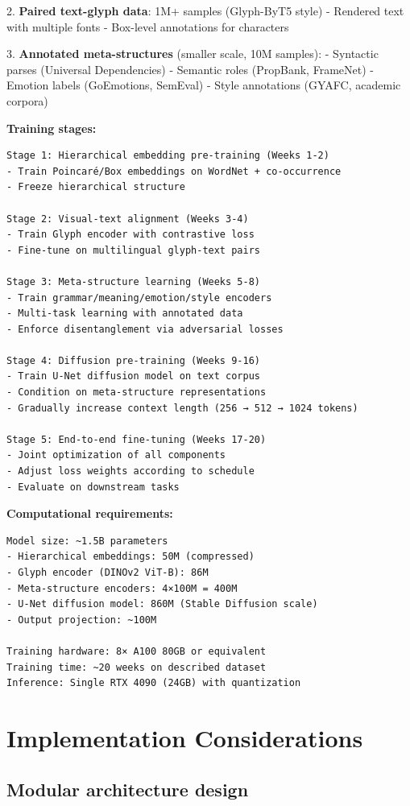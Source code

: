 \documentclass[11pt]{article}
\begin{document}
2. \textbf{Paired text-glyph data}: 1M+ samples (Glyph-ByT5 style)
   - Rendered text with multiple fonts
   - Box-level annotations for characters

3. \textbf{Annotated meta-structures} (smaller scale, 10M samples):
   - Syntactic parses (Universal Dependencies)
   - Semantic roles (PropBank, FrameNet)
   - Emotion labels (GoEmotions, SemEval)
   - Style annotations (GYAFC, academic corpora)

\textbf{Training stages:}

\begin{verbatim}
Stage 1: Hierarchical embedding pre-training (Weeks 1-2)
- Train Poincaré/Box embeddings on WordNet + co-occurrence
- Freeze hierarchical structure

Stage 2: Visual-text alignment (Weeks 3-4)
- Train Glyph encoder with contrastive loss
- Fine-tune on multilingual glyph-text pairs

Stage 3: Meta-structure learning (Weeks 5-8)
- Train grammar/meaning/emotion/style encoders
- Multi-task learning with annotated data
- Enforce disentanglement via adversarial losses

Stage 4: Diffusion pre-training (Weeks 9-16)
- Train U-Net diffusion model on text corpus
- Condition on meta-structure representations
- Gradually increase context length (256 → 512 → 1024 tokens)

Stage 5: End-to-end fine-tuning (Weeks 17-20)
- Joint optimization of all components
- Adjust loss weights according to schedule
- Evaluate on downstream tasks
\end{verbatim}

\textbf{Computational requirements:}

\begin{verbatim}
Model size: ~1.5B parameters
- Hierarchical embeddings: 50M (compressed)
- Glyph encoder (DINOv2 ViT-B): 86M
- Meta-structure encoders: 4×100M = 400M
- U-Net diffusion model: 860M (Stable Diffusion scale)
- Output projection: ~100M

Training hardware: 8× A100 80GB or equivalent
Training time: ~20 weeks on described dataset
Inference: Single RTX 4090 (24GB) with quantization
\end{verbatim}

\section{Implementation Considerations}

\subsection{Modular architecture design}
\end{document}
